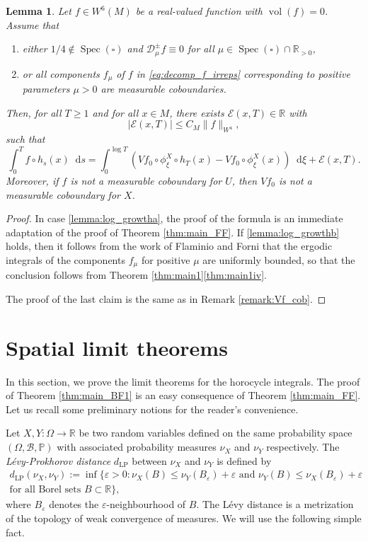 \documentclass[JEP,XML,SOM,NoEqCountersInSection,Unicode,published]{cedram}
\newenvironment{enumeratea}
{\bgroup\def\theenumi{\alph{enumi}}\begin{enumerate}}
{\end{enumerate}\egroup}
\newcommand \R{\mathbb{R}}
\newcommand*{\diff}{\mathop{}\!\mathrm{d}}
\newcommand{\Dpm}[1]{\mathcal{D}_\mu^{\pm} #1}
\newcommand{\Levy}{d_{\levyy}}
\DeclareMathOperator{\vol}{vol}
\DeclareMathOperator{\Spec}{Spec}
\DeclareMathOperator{\levyy}{LP}
\newtheorem {lemma}[theorem]{Lemma}
\theoremstyle{definition}
\begin{document}
\begin{lemma}\label{lemma:log_growth}
Let $f \in W^6(M)$ be a real-valued function with $\vol(f)=0$.
Assume that
\begin{enumeratea}
\item\label{lemma:log_growtha}
either $1/4 \notin \Spec(\square)$ and $\Dpm{f} \equiv 0$ for all $\mu \in \Spec(\square) \cap \R_{>0}$,
\item\label{lemma:log_growthb}
or all components $f_\mu$ of $f$ in \eqref{eq:decomp_f_irreps} corresponding to positive parameters $\mu >0$ are measurable coboundaries.
\end{enumeratea}
Then, for all $T \geq 1$ and for all $x \in M$, there exists $\mathcal{E}(x,T) \in \R$ with
\[
|\mathcal{E}(x,T) |\leq C_M \|f\|_{W^4},
\]
such that
\[
\int_0^T f \circ h_s(x) \diff s = \int_0^{\log T} \left(Vf_0 \circ \phi^X_{\xi}\circ h_T(x) - Vf_0\circ \phi^X_{\xi}(x) \right) \diff \xi + \mathcal{E}(x,T).
\]
Moreover, if $f$ is not a measurable coboundary for $U$, then $Vf_0$ is not a measurable coboundary for $X$.
\end{lemma}

\begin{proof}
In case \eqref{lemma:log_growtha}, the proof of the formula is an immediate adaptation of the proof of Theorem \ref{thm:main_FF}. If \eqref{lemma:log_growthb} holds, then it follows from the work of Flaminio and Forni that the ergodic integrals of the components $f_\mu$ for positive $\mu$ are uniformly bounded, so that the conclusion follows from Theorem \ref{thm:main1}\eqref{thm:main1iv}.

The proof of the last claim is the same as in Remark \ref{remark:Vf_cob}.
\end{proof}

\section{Spatial limit theorems}\label{sec:limit}

In this section, we prove the limit theorems for the horocycle integrals. The proof of Theorem \ref{thm:main_BF1} is an easy consequence of Theorem \ref{thm:main_FF}. Let us recall some preliminary notions for the reader's convenience.

Let $X,Y \colon \Omega \to \R$ be two random variables defined on the same probability space $(\Omega, \mathcal{B}, \mathbb{P})$ with associated probability measures $\nu_X$ and $\nu_Y$ respectively.
The \emph{Lévy-Prokhorov distance} $\Levy$ between $\nu_X$ and $\nu_Y$ is defined by
\begin{multline*}
\Levy(\nu_X, \nu_Y) := \inf \{\varepsilon > 0 : \nu_X(B) \leq \nu_Y(B_{\varepsilon}) + \varepsilon \text{\ and\ } \nu_Y(B) \leq \nu_X(B_{\varepsilon}) + \varepsilon \\
\text{for all Borel sets\ } B \subset \R\},
\end{multline*}
where $B_{\varepsilon}$ denotes the $\varepsilon$-neighbourhood of $B$.
The Lévy distance is a metrization of the topology of weak convergence of measures.
We will use the following simple fact.
\end{document}
